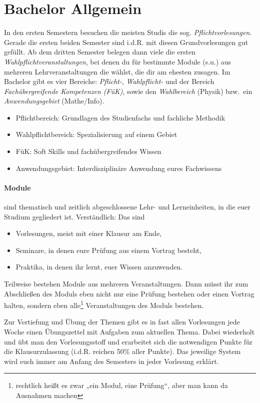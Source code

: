 \section{Bachelor Allgemein}
In den ersten Semestern besuchen die meisten Studis die sog. \emph{Pflichtvorlesungen}. Gerade die ersten beiden Semester sind i.d.R. mit diesen Grundvorlesungen gut gefüllt. Ab dem dritten Semester belegen dann viele die ersten \emph{Wahlpflichtveranstaltungen}, bei denen du für bestimmte Module (s.u.) aus mehreren Lehrveranstaltungen die wählst, die dir am ehesten zusagen. Im Bachelor gibt es vier Bereiche: \emph{Pflicht-}, \emph{Wahlpflicht-} und der Bereich \emph{Fachübergreifende Kompetenzen (FüK)}, sowie den \emph{Wahlbereich} (Physik) bzw.~ein \emph{Anwendungsgebiet} (Mathe/Info).

\begin{itemize}
	\item Pflichtbereich: Grundlagen des Studienfachs und fachliche Methodik
	\item Wahlpflichtbereich: Spezialisierung auf einem Gebiet
	\item FüK: Soft Skills und fachübergreifendes Wissen
	\item Anwendungsgebiet: Interdisziplinäre Anwendung eures Fachwissens
\end{itemize}

\paragraph*{Module} sind \glqq{}thematisch und zeitlich abgeschlossene Lehr- und Lerneinheiten\grqq{}, in die euer Studium gegliedert ist. Verständlich: Das sind

\begin{itemize}
	\item Vorlesungen, meist mit einer Klausur am Ende,
	\item Seminare, in denen eure Prüfung aus einem Vortrag besteht,
	\item Praktika, in denen ihr lernt, euer Wissen anzuwenden.
\end{itemize}

Teilweise bestehen Module aus mehreren Veranstaltungen. Dann müsst ihr zum Abschließen des Moduls eben nicht nur eine Prüfung bestehen oder einen Vortrag halten, sondern eben alle\footnote{rechtlich heißt es zwar „ein Modul, eine Prüfung“, aber man kann da Ausnahmen machen} Veranstaltungen des Moduls bestehen.

Zur Vertiefung und Übung der Themen gibt es in fast allen Vorlesungen jede Woche einen Übungszettel mit Aufgaben zum aktuellen Thema. Dabei wiederholt und übt man den Vorlesungsstoff und erarbeitet sich die notwendigen Punkte für die Klausurzulassung (i.d.R. reichen 50\% aller Punkte). Das jeweilige System wird euch immer am Anfang des Semesters in jeder Vorlesung erklärt.

